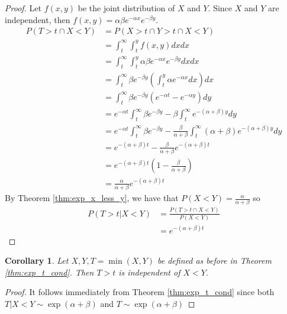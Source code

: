 \documentclass{article}
\theoremstyle{plain}
\newtheorem{cor}{Corollary}[theorem]
\theoremstyle{definition}
\theoremstyle{remark}
\begin{document}
\begin{proof}
Let $f(x,y)$ be the joint distribution of $X$ and $Y$.
Since $X$ and $Y$ are independent, then $f(x,y) = \alpha \beta e^{-\alpha x} e^{-\beta y}$.
\begin{align*}
    P(T > t \cap X < Y) &= P(X > t \cap Y > t \cap X < Y)\\
    &= \int_t^\infty \int_t^y f(x,y) dx dx\\
    &= \int_t^\infty \int_t^y \alpha \beta e^{-\alpha x} e^{-\beta y} dx dx\\
    &= \int_t^\infty \beta e^{-\beta y} \left(\int_t^y \alpha e^{-\alpha x} dx \right)  dx\\
    &= \int_t^\infty \beta e^{-\beta y} \left( e^{-\alpha t} - e^{-\alpha y} \right) dy\\
    &= e^{-\alpha t} \int_t^\infty \beta e^{-\beta y} - \beta \int_t^\infty e^{-(\alpha + \beta) y} dy\\
    &= e^{-\alpha t} \int_t^\infty \beta e^{-\beta y} - \frac{\beta}{\alpha + \beta} \int_t^\infty (\alpha + \beta) e^{-(\alpha + \beta) y} dy\\
    &= e^{-(\alpha + \beta) t} - \frac{\beta}{\alpha + \beta} e^{-(\alpha + \beta) t}\\
    &= e^{-(\alpha + \beta) t} (1 - \frac{\beta}{\alpha + \beta})\\
    &= \frac{\alpha}{\alpha + \beta} e^{-(\alpha + \beta) t}
\end{align*}
By Theorem \ref{thm:exp_x_less_y}, we have that $P(X < Y) = \frac{\alpha}{\alpha + \beta}$ so
\begin{align*}
    P(T > t | X < Y) &= \frac{P(T > t \cap X < Y)}{P(X < Y)}\\
    &= e^{-(\alpha + \beta) t}
\end{align*}

\end{proof}

\begin{cor}\label{cor:t_xy_indep}
Let $X, Y, T = \min(X,Y)$ be defined as before in Theorem \eqref{thm:exp_t_cond}.
Then $T > t$ is independent of $X < Y$.
\end{cor}

\begin{proof}
It follows immediately from Theorem \eqref{thm:exp_t_cond} since both $T | X < Y \sim \exp(\alpha + \beta)$ and $T \sim \exp(\alpha + \beta)$
\end{proof}
\end{document}
